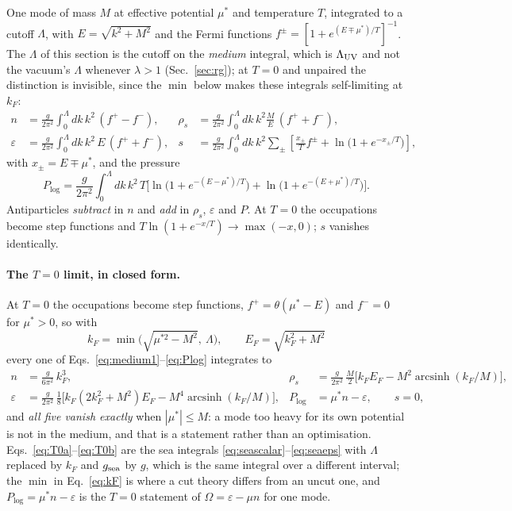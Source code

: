 \documentclass[aps,prc,onecolumn,superscriptaddress,nofootinbib,10pt]{revtex4-2}
\newcommand{\Lam}{\Lambda}
\begin{document}
One mode of mass $M$ at effective potential $\mu^{*}$ and temperature $T$,
integrated to a cutoff $\Lam$, with $E = \sqrt{k^2+M^2}$ and the Fermi
functions $f^{\pm} = [1+e^{(E \mp \mu^{*})/T}]^{-1}$. The $\Lam$ of this
section is the cutoff on the \emph{medium} integral, which is $\Lam_{\rm UV}$
and not the vacuum's $\Lam$ whenever $\lambda > 1$ (Sec.~\ref{sec:rg}); at
$T = 0$ and unpaired the distinction is invisible, since the $\min$ below makes
these integrals self-limiting at $k_F$:
\begin{align}
  n     &= \frac{g}{2\pi^2}\int_0^{\Lam}\!\! dk\, k^2 \,(f^{+}-f^{-}) ,
  &
  \rho_s &= \frac{g}{2\pi^2}\int_0^{\Lam}\!\! dk\, k^2 \frac{M}{E}\,(f^{+}+f^{-}) ,
  \label{eq:medium1}\\
  \varepsilon &= \frac{g}{2\pi^2}\int_0^{\Lam}\!\! dk\, k^2\, E\,(f^{+}+f^{-}) ,
  &
  s &= \frac{g}{2\pi^2}\int_0^{\Lam}\!\! dk\, k^2 \sum_{\pm}
      \left[ \frac{x_{\pm}}{T} f^{\pm} + \ln\!\big(1+e^{-x_{\pm}/T}\big)\right] ,
  \label{eq:medium2}
\end{align}
with $x_{\pm} = E \mp \mu^{*}$, and the pressure
\begin{equation}
  P_{\log} = \frac{g}{2\pi^2}\int_0^{\Lam}\!\! dk\, k^2\, T
    \Big[ \ln\!\big(1+e^{-(E-\mu^{*})/T}\big)
        + \ln\!\big(1+e^{-(E+\mu^{*})/T}\big) \Big] .
  \label{eq:Plog}
\end{equation}
Antiparticles \emph{subtract} in $n$ and \emph{add} in $\rho_s$,
$\varepsilon$ and $P$. At $T = 0$ the occupations become step functions and
$T\ln(1+e^{-x/T}) \to \max(-x,0)$; $s$ vanishes identically.

\paragraph{The $T = 0$ limit, in closed form.} At $T = 0$ the occupations
become step functions, $f^{+} = \theta(\mu^{*} - E)$ and $f^{-} = 0$ for
$\mu^{*} > 0$, so with
\begin{equation}
  k_F = \min\!\Big(\sqrt{\mu^{*2} - M^2},\ \Lam\Big) , \qquad
  E_F = \sqrt{k_F^2 + M^2}
  \label{eq:kF}
\end{equation}
every one of Eqs.~\eqref{eq:medium1}--\eqref{eq:Plog} integrates to
\begin{align}
  n &= \frac{g}{6\pi^2}\,k_F^3 ,
  &
  \rho_s &= \frac{g}{2\pi^2}\,\frac{M}{2}
       \Big[ k_F E_F - M^2 \operatorname{arcsinh}(k_F/M) \Big] ,
  \label{eq:T0a}\\
  \varepsilon &= \frac{g}{2\pi^2}\,\frac18
       \Big[ k_F (2k_F^2 + M^2) E_F - M^4 \operatorname{arcsinh}(k_F/M) \Big] ,
  &
  P_{\log} &= \mu^{*} n - \varepsilon , \qquad s = 0 ,
  \label{eq:T0b}
\end{align}
and \emph{all five vanish exactly} when $|\mu^{*}| \le M$: a mode too heavy for
its own potential is not in the medium, and that is a statement rather than an
optimisation. Eqs.~\eqref{eq:T0a}--\eqref{eq:T0b} are the sea integrals
\eqref{eq:seascalar}--\eqref{eq:seaeps} with $\Lam$ replaced by $k_F$ and
$g_{\rm sea}$ by $g$, which is the same integral over a different interval;
the $\min$ in Eq.~\eqref{eq:kF} is where a cut theory differs from an
uncut one, and $P_{\log} = \mu^{*} n - \varepsilon$ is the $T = 0$ statement of
$\Omega = \varepsilon - \mu n$ for one mode.
\end{document}
